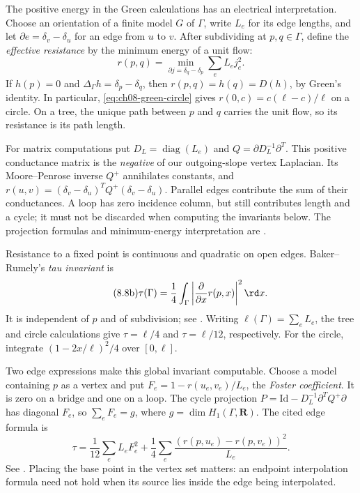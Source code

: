 The positive energy in the Green calculations has an electrical
interpretation. Choose an orientation of a finite model $G$ of $\Gamma$,
write $L_e$ for its edge lengths, and let $\partial e=\delta_v-\delta_u$
for an edge from $u$ to $v$. After subdividing at $p,q\in\Gamma$, define
the \emph{effective resistance} by the minimum energy of a unit flow:
\[\tag{8.8a}\label{eq:ch08-effective-resistance}
 r(p,q)=\min_{\partial j=\delta_q-\delta_p}\sum_e L_e j_e^2.
\]
If $h(p)=0$ and $\Delta_\Gamma h=\delta_p-\delta_q$, then
$r(p,q)=h(q)=D(h)$, by Green's identity. In particular,
\eqref{eq:ch08-green-circle} gives
$r(0,c)=c(\ell-c)/\ell$ on a circle. On a tree, the unique path
between $p$ and $q$ carries the unit flow, so its resistance is its
path length.

For matrix computations put $D_L=\operatorname{diag}(L_e)$ and
$Q=\partial D_L^{-1}\partial^T$. This positive conductance matrix is
the \emph{negative} of our outgoing-slope vertex Laplacian. Its
Moore--Penrose inverse $Q^+$ annihilates constants, and
$r(u,v)=(\delta_v-\delta_u)^TQ^+(\delta_v-\delta_u)$.
Parallel edges contribute the sum of their conductances. A loop has
zero incidence column, but still contributes length and a cycle;
it must not be discarded when computing the invariants below.
The projection formulas and minimum-energy interpretation are
\cite[Proposition~5.2, Theorem~7.8 and Remark~7.15]{dJS22RayleighPublished}.

Resistance to a fixed point is continuous and quadratic on open
edges. Baker--Rumely's \emph{tau invariant} is
\[\tag{8.8b}\label{eq:ch08-tau-energy}
 \tau(\Gamma)=\frac14\int_\Gamma
                  \left|\frac{\partial}{\partial x}r(p,x)\right|^2\rd x.
\]
It is independent of $p$ and of subdivision; see
\cite[Section~14, Lemma~14.4]{BakerRumely05HarmonicV2}.
Writing $\ell(\Gamma)=\sum_eL_e$, the tree and circle calculations give
$\tau=\ell/4$ and $\tau=\ell/12$, respectively. For the circle,
integrate $(1-2x/\ell)^2/4$ over $[0,\ell]$.

Two edge expressions make this global invariant computable. Choose
a model containing $p$ as a vertex and put
$F_e=1-r(u_e,v_e)/L_e$, the \emph{Foster coefficient}. It is zero
on a bridge and one on a loop. The cycle projection
$P=\mathrm{Id}-D_L^{-1}\partial^TQ^+\partial$ has diagonal $F_e$,
so $\sum_eF_e=g$, where $g=\dim H_1(\Gamma,\mathbf R)$.
The cited edge formula is
\[\tag{8.8c}\label{eq:ch08-tau-edge}
 \tau=\frac1{12}\sum_e L_eF_e^2
       +\frac14\sum_e\frac{(r(p,u_e)-r(p,v_e))^2}{L_e}.
\]
See \cite[Theorem~11.2]{dJS23TropicalMomentsPublished}.
Placing the base point in the vertex set matters: an endpoint
interpolation formula need not hold when its source lies inside
the edge being interpolated.

